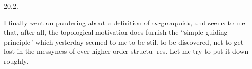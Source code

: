 20.2.

I finally went on pondering about a definition of $\infty$-groupoids, and 
seems to me that, after all, the topological motivation does furnish the
``simple guiding principle'' which yesterday seemed to me to be still to be
discovered,  not to get lost in the messyness of ever higher order structu-%
res. Let me try to put it down roughly.

